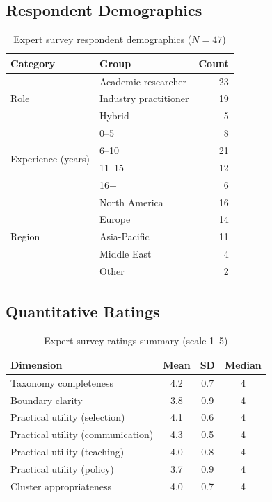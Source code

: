 \documentclass[acmlarge]{acmart}
\begin{document}
\subsection{Respondent Demographics}

\begin{table}[ht]
\caption{Expert survey respondent demographics ($N=47$)}
\label{tab:demographics}
\begin{tabular}{@{}llr@{}}
\toprule
\textbf{Category} & \textbf{Group} & \textbf{Count} \\
\midrule
\multirow{3}{*}{Role} & Academic researcher & 23 \\
 & Industry practitioner & 19 \\
 & Hybrid & 5 \\
\midrule
\multirow{4}{*}{Experience (years)} & 0--5 & 8 \\
 & 6--10 & 21 \\
 & 11--15 & 12 \\
 & 16+ & 6 \\
\midrule
\multirow{5}{*}{Region} & North America & 16 \\
 & Europe & 14 \\
 & Asia-Pacific & 11 \\
 & Middle East & 4 \\
 & Other & 2 \\
\bottomrule
\end{tabular}
\end{table}

\subsection{Quantitative Ratings}

\begin{table}[ht]
\caption{Expert survey ratings summary (scale 1--5)}
\label{tab:ratings}
\begin{tabular}{@{}lccc@{}}
\toprule
\textbf{Dimension} & \textbf{Mean} & \textbf{SD} & \textbf{Median} \\
\midrule
Taxonomy completeness    & 4.2 & 0.7 & 4 \\
Boundary clarity         & 3.8 & 0.9 & 4 \\
Practical utility (selection) & 4.1 & 0.6 & 4 \\
Practical utility (communication) & 4.3 & 0.5 & 4 \\
Practical utility (teaching) & 4.0 & 0.8 & 4 \\
Practical utility (policy) & 3.7 & 0.9 & 4 \\
Cluster appropriateness  & 4.0 & 0.7 & 4 \\
\bottomrule
\end{tabular}
\end{table}
\end{document}
